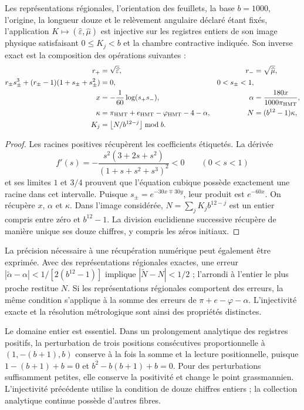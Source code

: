 \begin{theorem}
\label{thm:compat-recuperacion-constitutiva}
Les représentations régionales, l'orientation des feuillets, la base \(b=1000\), l'origine, la longueur douze et le relèvement angulaire déclaré étant fixés, l'application \(K\mapsto(\widehat\varepsilon,\widehat\mu)\) est injective sur les registres entiers de son image physique satisfaisant \(0\leq K_j<b\) et la chambre contractive indiquée. Son inverse exact est la composition des opérations suivantes :
\begin{align*}
 r_+&=\sqrt{\widehat\varepsilon},&
 r_-&=\sqrt{\widehat\mu},\\
 r_\pm s_\pm^3+(r_\pm-1)(1+s_\pm+s_\pm^2)&=0,
 &0<s_\pm<1,\\
 x&=-\frac1{60}\log(s_+s_-),&
 \alpha&=\frac{180x}{1000\pi_{\rm HMT}},\\
 \kappa&=\pi_{\rm HMT}+e_{\rm HMT}-\varphi_{\rm HMT}-4-\alpha,
 &N&=(b^{12}-1)\kappa,\\
 K_j&=\left\lfloor N/b^{12-j}\right\rfloor\bmod b.
\end{align*}
\end{theorem}
\begin{proof}
Les racines positives récupèrent les coefficients étiquetés. La dérivée
\[
 f'(s)=-\frac{s^2(3+2s+s^2)}{(1+s+s^2+s^3)^2}<0
 \qquad(0<s<1)
\]
et ses limites \(1\) et \(3/4\) prouvent que l'équation cubique possède exactement une racine dans cet intervalle. Puisque \(s_\pm=e^{-30x\mp30y}\), leur produit est \(e^{-60x}\). On récupère \(x\), \(\alpha\) et \(\kappa\). Dans l'image considérée, \(N=\sum_jK_jb^{12-j}\) est un entier compris entre zéro et \(b^{12}-1\). La division euclidienne successive récupère de manière unique ses douze chiffres, y compris les zéros initiaux.
\end{proof}

La précision nécessaire à une récupération numérique peut également être exprimée. Avec des représentations régionales exactes, une erreur \(|\widetilde\alpha-\alpha|<1/[2(b^{12}-1)]\) implique \(|\widetilde N-N|<1/2\) ; l'arrondi à l'entier le plus proche restitue \(N\). Si les représentations régionales comportent des erreurs, la même condition s'applique à la somme des erreurs de \(\pi+e-\varphi-\alpha\). L'injectivité exacte et la résolution métrologique sont ainsi des propriétés distinctes.

Le domaine entier est essentiel. Dans un prolongement analytique des registres positifs, la perturbation de trois positions consécutives proportionnelle à \((1,-(b+1),b)\) conserve à la fois la somme et la lecture positionnelle, puisque \(1-(b+1)+b=0\) et \(b^2-b(b+1)+b=0\). Pour des perturbations suffisamment petites, elle conserve la positivité et change le point grassmannien. L'injectivité précédente utilise la condition de douze chiffres entiers ; la collection analytique continue possède d'autres fibres.

